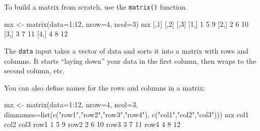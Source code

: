 \documentclass[
]{book}
\newenvironment{Shaded}{\begin{snugshade}}{\end{snugshade}}
\newcommand{\AttributeTok}[1]{\textcolor[rgb]{0.77,0.63,0.00}{#1}}
\newcommand{\DecValTok}[1]{\textcolor[rgb]{0.00,0.00,0.81}{#1}}
\newcommand{\FunctionTok}[1]{\textcolor[rgb]{0.00,0.00,0.00}{#1}}
\newcommand{\NormalTok}[1]{#1}
\newcommand{\OtherTok}[1]{\textcolor[rgb]{0.56,0.35,0.01}{#1}}
\newcommand{\SpecialCharTok}[1]{\textcolor[rgb]{0.00,0.00,0.00}{#1}}
\newcommand{\StringTok}[1]{\textcolor[rgb]{0.31,0.60,0.02}{#1}}
\begin{document}
To build a matrix from scratch, use the \texttt{matrix()} function.

\begin{Shaded}
\begin{Highlighting}[]
\NormalTok{mx }\OtherTok{\textless{}{-}} \FunctionTok{matrix}\NormalTok{(}\AttributeTok{data=}\DecValTok{1}\SpecialCharTok{:}\DecValTok{12}\NormalTok{, }
             \AttributeTok{nrow=}\DecValTok{4}\NormalTok{,}
             \AttributeTok{ncol=}\DecValTok{3}\NormalTok{)}
\NormalTok{mx}
\NormalTok{     [,}\DecValTok{1}\NormalTok{] [,}\DecValTok{2}\NormalTok{] [,}\DecValTok{3}\NormalTok{]}
\NormalTok{[}\DecValTok{1}\NormalTok{,]    }\DecValTok{1}    \DecValTok{5}    \DecValTok{9}
\NormalTok{[}\DecValTok{2}\NormalTok{,]    }\DecValTok{2}    \DecValTok{6}   \DecValTok{10}
\NormalTok{[}\DecValTok{3}\NormalTok{,]    }\DecValTok{3}    \DecValTok{7}   \DecValTok{11}
\NormalTok{[}\DecValTok{4}\NormalTok{,]    }\DecValTok{4}    \DecValTok{8}   \DecValTok{12}
\end{Highlighting}
\end{Shaded}

The \texttt{data} input takes a vector of data and sorts it into a matrix with rows and columns. It starts ``laying down'' your data in the first column, then wraps to the second column, etc.

You can also define names for the rows and columns in a matrix:

\begin{Shaded}
\begin{Highlighting}[]
\NormalTok{mx }\OtherTok{\textless{}{-}} \FunctionTok{matrix}\NormalTok{(}\AttributeTok{data=}\DecValTok{1}\SpecialCharTok{:}\DecValTok{12}\NormalTok{, }
             \AttributeTok{nrow=}\DecValTok{4}\NormalTok{,}
             \AttributeTok{ncol=}\DecValTok{3}\NormalTok{,}
             \AttributeTok{dimnames=}\FunctionTok{list}\NormalTok{(}\FunctionTok{c}\NormalTok{(}\StringTok{"row1"}\NormalTok{,}\StringTok{"row2"}\NormalTok{,}\StringTok{"row3"}\NormalTok{,}\StringTok{"row4"}\NormalTok{),}
                           \FunctionTok{c}\NormalTok{(}\StringTok{"col1"}\NormalTok{,}\StringTok{"col2"}\NormalTok{,}\StringTok{"col3"}\NormalTok{)))}
\NormalTok{mx}
\NormalTok{     col1 col2 col3}
\NormalTok{row1    }\DecValTok{1}    \DecValTok{5}    \DecValTok{9}
\NormalTok{row2    }\DecValTok{2}    \DecValTok{6}   \DecValTok{10}
\NormalTok{row3    }\DecValTok{3}    \DecValTok{7}   \DecValTok{11}
\NormalTok{row4    }\DecValTok{4}    \DecValTok{8}   \DecValTok{12}
\end{Highlighting}
\end{Shaded}
\end{document}
